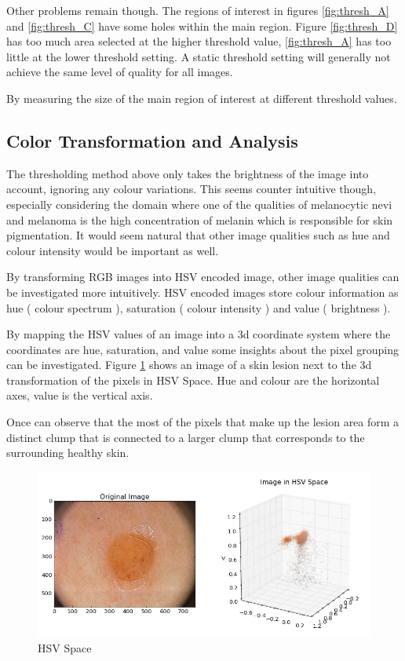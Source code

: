 Other problems remain though. The regions of interest in figures \ref{fig:thresh_A} and \ref{fig:thresh_C} have some holes within the main region. Figure \ref{fig:thresh_D} has too much area selected at the higher threshold value, \ref{fig:thresh_A} has too little at the lower threshold setting. A static threshold setting will generally not achieve the same level of quality for all images.

By measuring the size of the main region of interest at different threshold values.

\subsection{Color Transformation and Analysis}

The thresholding method above only takes the brightness of the image into account, ignoring any colour variations. This seems counter intuitive though, especially considering the domain where one of the qualities of melanocytic nevi and melanoma is the high concentration of melanin which is responsible for skin pigmentation. It would seem natural that other image qualities such as hue and colour intensity would be important as well.

By transforming RGB images into HSV encoded image, other image qualities can be investigated more intuitively. HSV encoded images store colour information as hue ( colour spectrum ), saturation ( colour intensity ) and value ( brightness ).

By mapping the HSV values of an image into a 3d coordinate system where the coordinates are hue, saturation, and value some insights about the pixel grouping can be investigated. Figure \ref{fig:hsv_place} shows an image of a skin lesion next to the 3d transformation of the pixels in HSV Space. Hue and colour are the horizontal axes, value is the vertical axis.

Once can observe that the most of the pixels that make up the lesion area form a distinct clump that is connected to a larger clump that corresponds to the surrounding healthy skin.


\begin{figure}[H]
    \includegraphics[width=\textwidth,keepaspectratio]{assets/image_processing/hsv/hsv_3dplot.png}
    \caption{HSV Space}
    \label{fig:hsv_place}
\end{figure}

